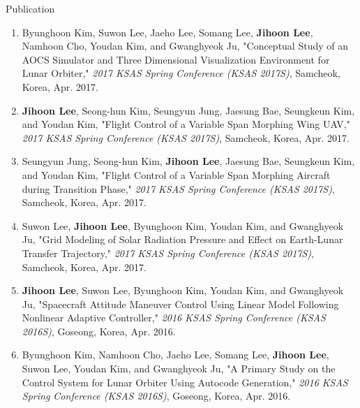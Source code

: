 \documentclass{resume}
\begin{document}
\begin{rSection}{Publication}
\begin{enumerate}
		\item Byunghoon Kim, Suwon Lee, Jaeho Lee, Somang Lee, \textbf{Jihoon Lee}, Namhoon Cho, Youdan Kim, and Gwanghyeok Ju, "Conceptual Study of an AOCS Simulator and Three Dimensional Visualization Environment for Lunar Orbiter," \textit{2017 KSAS Spring Conference (KSAS 2017S)}, Samcheok, Korea, Apr. 2017. 
		
		\item \textbf{Jihoon Lee}, Seong-hun Kim, Seungyun Jung, Jaesung Bae, Seungkeun Kim, and Youdan Kim, "Flight Control of a Variable Span Morphing Wing UAV," \textit{2017 KSAS Spring Conference (KSAS 2017S)}, Samcheok, Korea, Apr. 2017. 
		
		\item Seungyun Jung, Seong-hun Kim, \textbf{Jihoon Lee}, Jaesung Bae, Seungkeun Kim, and Youdan Kim, "Flight Control of a Variable Span Morphing Aircraft during Transition Phase," \textit{2017 KSAS Spring Conference (KSAS 2017S)}, Samcheok, Korea, Apr. 2017. 
		
		\item Suwon Lee, \textbf{Jihoon Lee}, Byunghoon Kim, Youdan Kim, and Gwanghyeok Ju, "Grid Modeling of Solar Radiation Pressure and Effect on Earth-Lunar Transfer Trajectory," \textit{2017 KSAS Spring Conference (KSAS 2017S)}, Samcheok, Korea, Apr. 2017. 
		
		\item \textbf{Jihoon Lee}, Suwon Lee, Byunghoon Kim, Youdan Kim, and Gwanghyeok Ju, "Spacecraft Attitude Maneuver Control Using Linear Model Following Nonlinear Adaptive Controller," \textit{2016 KSAS Spring Conference (KSAS 2016S)}, Goseong, Korea, Apr. 2016. 
		
		\item Byunghoon Kim, Namhoon Cho, Jaeho Lee, Somang Lee, \textbf{Jihoon Lee}, Suwon Lee, Youdan Kim, and Gwanghyeok Ju, "A Primary Study on the Control System for Lunar Orbiter Using Autocode Generation," \textit{2016 KSAS Spring Conference (KSAS 2016S)}, Goseong, Korea, Apr. 2016. 
		

\end{enumerate}
\end{rSection}
\end{document}
